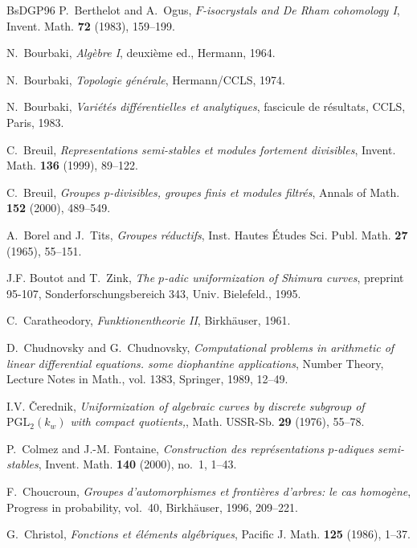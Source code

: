 \begin{thebibliography}{BsDGP96}
P.~Berthelot and A.~Ogus, \emph{${F}$-isocrystals and {D}e {R}ham cohomology
  {I}}, Invent. Math. \textbf{72} (1983), 159--199.

N.~Bourbaki, \emph{Alg\`ebre {I}}, deuxi\`eme ed., Hermann, 1964.

N.~Bourbaki, \emph{Topologie g\'en\'erale}, Hermann/CCLS, 1974.

N.~Bourbaki, \emph{Vari\'et\'es diff\'erentielles et analytiques}, fascicule de
  r\'esultats, CCLS, Paris, 1983.

C.~Breuil, \emph{Representations semi-stables et modules fortement divisibles},
  Invent. Math. \textbf{136} (1999), 89--122.

C.~Breuil, \emph{Groupes p-divisibles, groupes finis et modules filtr\'es},
  Annals of Math. \textbf{152} (2000), 489--549.

A.~Borel and J.~Tits, \emph{Groupes r\'eductifs}, Inst. Hautes {\'E}tudes Sci.
  Publ. Math. \textbf{27} (1965), 55--151.

J.F. Boutot and T.~Zink, \emph{The $p$-adic uniformization of {S}himura
  curves}, preprint 95-107, Sonderforschungsbereich 343, Univ. Bielefeld.,
  1995.

C.~Caratheodory, \emph{Funktionentheorie {I}{I}}, Birkh\"auser, 1961.

D.~Chudnovsky and G.~Chudnovsky, \emph{Computational problems in arithmetic of
  linear differential equations. some diophantine applications}, Number Theory,
  Lecture Notes in Math., vol. 1383, Springer, 1989, 12--49.

I.V. {\v{C}}erednik, \emph{Uniformization of algebraic curves by
  discrete subgroup of $\mathrm{P{G}{L}}_2(k_w)$ with compact quotients,},
  Math. USSR-Sb. \textbf{29} (1976), 55--78.

P.~Colmez and J.-M. Fontaine,
\emph{Construction des repr\'esentations $p$-adiques semi-stables},
Invent. Math. \textbf{140} (2000), no.~1, 1--43.

F.~Choucroun, \emph{Groupes d'automorphismes et fronti\`eres d'arbres: le cas
  homog\`ene}, Progress in probability, vol.~40, Birkh\"auser, 1996, 209--221.

G.~Christol, \emph{Fonctions et \'el\'ements alg\'ebriques}, Pacific J. Math.
  \textbf{125} (1986), 1--37.


\end{thebibliography}
